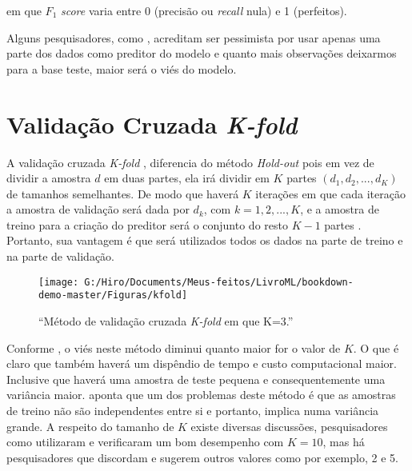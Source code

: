 \documentclass[
  openany]{book}
\begin{document}
em que \(F_1\) \emph{score} varia entre 0 (precisão ou \emph{recall} nula) e 1 (perfeitos).

Alguns pesquisadores, como \citet{kohavi1995study}, acreditam ser pessimista por usar apenas uma parte dos dados como preditor do modelo e quanto mais observações deixarmos para a base teste, maior será o viés do modelo.

\hypertarget{kfold}{%
\section{\texorpdfstring{Validação Cruzada \emph{K-fold}}{Validação Cruzada K-fold}}\label{kfold}}

A validação cruzada \emph{K-fold} \citep{burman1989comparative}, diferencia do método \emph{Hold-out} pois em vez de dividir a amostra \(d\) em duas partes, ela irá dividir em \(K\) partes \((d_1,d_2,...,d_K)\) de tamanhos semelhantes. De modo que haverá \(K\) iterações em que cada iteração a amostra de validação será dada por \(d_k\), com \(k=1,2,...,K\), e a amostra de treino para a criação do preditor será o conjunto do resto \(K-1\) partes \citep{cunha2019estudo}. Portanto, sua vantagem é que será utilizados todos os dados na parte de treino e na parte de validação.

\begin{figure}

{\centering \texttt{[image: G:/Hiro/Documents/Meus-feitos/LivroML/bookdown-demo-master/Figuras/kfold]} 

}

\caption{``Método de validação cruzada \emph{K-fold} em que K=3.''}\label{fig:kfold}
\end{figure}



Conforme \citep{borra2010measuring}, o viés neste método diminui quanto maior for o valor de \(K\). O que é claro que também haverá um dispêndio de tempo e custo computacional maior. Inclusive que haverá uma amostra de teste pequena e consequentemente uma variância maior. \citep{breiman1996heuristics} aponta que um dos problemas deste método é que as amostras de treino não são independentes entre si e portanto, implica numa variância grande. A respeito do tamanho de \(K\) existe diversas discussões, pesquisadores como \citep{borra2010measuring, kohavi1995study, cunha2019estudo} utilizaram e verificaram um bom desempenho com \(K=10\), mas há pesquisadores que discordam e sugerem outros valores como por exemplo, 2 e 5.
\end{document}
